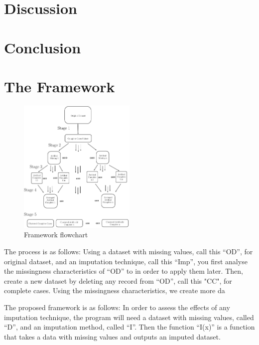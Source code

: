 \documentclass{IEEEconf}
\begin{document}
	\section{Discussion} %
	\label{sec:discussion}
		

	\section{Conclusion} %
	\label{sec:conclusion}
		


	\section{The Framework} %
	\label{sec:the_framework}

		\begin{figure}[!ht]
			\caption{Framework flowchart}
			\centering
			\includegraphics[width=0.5\textwidth]{diagram.pdf}
		\end{figure}
		The process is as follows: Using a dataset with missing values, call this ``OD'', for original dataset, and an imputation technique, call this ``Imp'', you first analyse the missingness characteristics of ``OD'' to in order to apply them later. Then, create a new dataset by deleting any record from ``OD'', call this "CC", for complete cases. Using the missingness characteristics, we create more da

		The proposed framework is as follows: In order to assess the effects of any imputation technique, the program will need a dataset with missing values, called ``D'', and an imputation method, called ``I''. Then the function ``I(x)'' is a function that takes a data with missing values and outputs an imputed dataset. 
\end{document}

